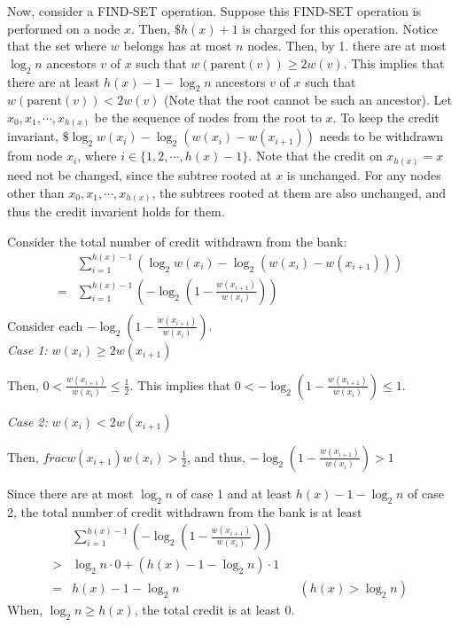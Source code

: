 \documentclass[10pt]{article}
\begin{document}
\begin{enumerate}
		Now, consider a FIND-SET operation.
		Suppose this FIND-SET operation is performed on a node $x$.
		Then, $\$h(x)+1$ is charged for this operation.
		Notice that the set where $w$ belongs has at most $n$ nodes.
		Then, by 1. there are at most $\log_2n$ ancestors $v$ of $x$ such that
		$w(\text{parent}(v)) \geq 2w(v)$.
		This implies that there are at least $h(x)-1 - \log_2n$ ancestors $v$
		of $x$ such that $w(\text{parent}(v)) < 2w(v)$ (Note that the root
		cannot be such an ancestor).
		Let $x_0, x_1, \cdots, x_{h(x)}$ be the sequence of nodes from the root
		to $x$.
		To keep the credit invariant, $\$\log_2w(x_i) - \log_2(w(x_i) -
		w(x_{i+1}))$ needs to be withdrawn from node $x_i$, where $i \in \{1,
		2, \cdots, h(x)-1\}$. 
		Note that the credit on $x_{h(x)} = x$ need not be changed, since the
		subtree rooted at $x$ is unchanged.
		For any nodes other than $x_0, x_1, \cdots, x_{h(x)}$, the subtrees
		rooted at them are also unchanged, and thus the credit invarient holds
		for them.

		Consider the total number of credit withdrawn from the bank:
		\begin{align*}
			& \sum_{i=1}^{h(x)-1}(\log_2w(x_i) - \log_2(w(x_i) - w(x_{i+1}))) \\
			=& \sum_{i=1}^{h(x)-1} \left(- \log_2(1 -
			\frac{w(x_{i+1})}{w(x_i)}) \right) \\
		\end{align*}
		Consider each $- \log_2(1 - \frac{w(x_{i+1})}{w(x_i)})$. \\
		\textit{Case 1:} $w(x_{i}) \geq 2w(x_{i+1})$
		\begin{addmargin}[1em]{0em}
			Then, $0 < \frac{w(x_{i+1})}{w(x_i)} \leq \frac{1}{2}$.
			This implies that $0< -\log_2(1-\frac{w(x_{i+1})}{w(x_i)}) \leq 1$.
		\end{addmargin}
		\textit{Case 2:} $w(x_{i}) < 2w(x_{i+1})$
		\begin{addmargin}[1em]{0em}
			Then, $frac{w(x_{i+1})}{w(x_i)} > \frac{1}{2}$, and thus, $-
			\log_2(1 - \frac{w(x_{i+1})}{w(x_i)}) > 1$
		\end{addmargin}
		Since there are at most $\log_2n$ of case 1 and at least
		$h(x)-1-\log_2n$ of case 2, the total number of credit withdrawn from
		the bank is at least
		\begin{align*}
			& \sum_{i=1}^{h(x)-1} \left(- \log_2(1 - \frac{w(x_{i+1})}{w(x_i)})
			\right) \\
			>& \log_2n \cdot 0 + (h(x) - 1 - \log_2n) \cdot 1 \\
			=& h(x) - 1 - \log_2n && (h(x) > \log_2n)
		\end{align*}
		When, $\log_2n \geq h(x)$, the total credit is at least 0.


\end{enumerate}
\end{document}
